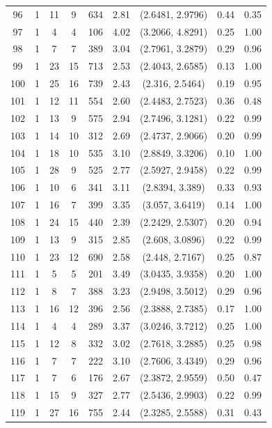 \documentclass{article}
\begin{document}
\begin{appendices}
\begin{longtable}{ccccccccc}
96 &   1 &  11 &   9 & 634 & 2.81 & (2.6481, 2.9796) & 0.44 & 0.35 \\ 
97 &   1 &   4 &   4 & 106 & 4.02 & (3.2066, 4.8291) & 0.25 & 1.00 \\ 
98 &   1 &   7 &   7 & 389 & 3.04 & (2.7961, 3.2879) & 0.29 & 0.96 \\ 
99 &   1 &  23 &  15 & 713 & 2.53 & (2.4043, 2.6585) & 0.13 & 1.00 \\ 
100 &   1 &  25 &  16 & 739 & 2.43 & (2.316, 2.5464) & 0.19 & 0.95 \\ 
101 &   1 &  12 &  11 & 554 & 2.60 & (2.4483, 2.7523) & 0.36 & 0.48 \\ 
102 &   1 &  13 &   9 & 575 & 2.94 & (2.7496, 3.1281) & 0.22 & 0.99 \\ 
103 &   1 &  14 &  10 & 312 & 2.69 & (2.4737, 2.9066) & 0.20 & 0.99 \\ 
104 &   1 &  18 &  10 & 535 & 3.10 & (2.8849, 3.3206) & 0.10 & 1.00 \\ 
105 &   1 &  28 &   9 & 525 & 2.77 & (2.5927, 2.9458) & 0.22 & 0.99 \\ 
106 &   1 &  10 &   6 & 341 & 3.11 & (2.8394, 3.389) & 0.33 & 0.93 \\ 
107 &   1 &  16 &   7 & 399 & 3.35 & (3.057, 3.6419) & 0.14 & 1.00 \\ 
108 &   1 &  24 &  15 & 440 & 2.39 & (2.2429, 2.5307) & 0.20 & 0.94 \\ 
109 &   1 &  13 &   9 & 315 & 2.85 & (2.608, 3.0896) & 0.22 & 0.99 \\ 
110 &   1 &  23 &  12 & 690 & 2.58 & (2.448, 2.7167) & 0.25 & 0.87 \\ 
111 &   1 &   5 &   5 & 201 & 3.49 & (3.0435, 3.9358) & 0.20 & 1.00 \\ 
112 &   1 &   8 &   7 & 388 & 3.23 & (2.9498, 3.5012) & 0.29 & 0.96 \\ 
113 &   1 &  16 &  12 & 396 & 2.56 & (2.3888, 2.7385) & 0.17 & 1.00 \\ 
114 &   1 &   4 &   4 & 289 & 3.37 & (3.0246, 3.7212) & 0.25 & 1.00 \\ 
115 &   1 &  12 &   8 & 332 & 3.02 & (2.7618, 3.2885) & 0.25 & 0.98 \\ 
116 &   1 &   7 &   7 & 222 & 3.10 & (2.7606, 3.4349) & 0.29 & 0.96 \\ 
117 &   1 &   7 &   6 & 176 & 2.67 & (2.3872, 2.9559) & 0.50 & 0.47 \\ 
118 &   1 &  15 &   9 & 327 & 2.77 & (2.5436, 2.9903) & 0.22 & 0.99 \\ 
119 &   1 &  27 &  16 & 755 & 2.44 & (2.3285, 2.5588) & 0.31 & 0.43 \\ 

\end{longtable}
\end{appendices}
\end{document}
